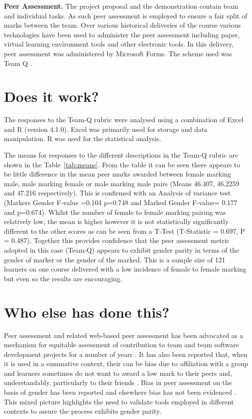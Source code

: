 \documentclass[sigconf, anonymous=true]{acmart}
\begin{document}
\textbf{Peer Assessment.}
The project proposal and the demonstration contain team and individual tasks. As such peer assessment is employed to ensure a fair split of marks between the team. Over various historical deliveries of the course various technologies have been used to administer the peer assessment including paper, virtual learning environment tools and other electronic tools. In this delivery, peer assessment was administered by Microsoft Forms. The scheme used was Team Q \cite{Britton2017}.
\section{Does it work?}	
The responses to the Team-Q rubric were analysed using a combination of Excel and R (version 4.1.0). Excel was primarily used for storage and data manipulation. R was used for the statistical analysis. 

The means for responses to the different descriptions in the Team-Q rubric are shown in the Table~\ref{tab:means}. From the table it can be seen there appears to be little difference in the mean peer marks awarded between female marking male, male marking female or male marking male pairs (Means 46.407, 46.2259 and 47.216 respectively). This is confirmed with an Analysis of variance test (Markers Gender F-value =0.104 p=0.748 and Marked Gender F-value= 0.177 and p=0.674). Whilst the number of female to female marking pairing was relatively low, the mean is higher however it is not statistically significantly different to the other scores as can be seen from a T-Test (T-Statistic = 0.697, P = 0.487). Together this provides confidence that the peer assessment metric adopted in this case (Team-Q) appears to exhibit gender parity in terms of the gender of marker or the gender of the marked. This is a sample size of 121 learners on one course delivered with a low incidence of female to female marking but even so the results are encouraging.


\section{Who else has done this?}
Peer assessment and related web-based peer assessment has been advocated as a mechanism for equitable assessment of contribution to team and team software development projects for a number of years \cite{Clark2005,Raban_Litchfield_2007, Gordon2010,Fagerholm, Britton2017,Philips21}. It has also been reported that, when it is used in a summative context, their can be bias due to affiliation with a group \cite{Cestone2008} and learners sometimes do not want to award a low mark to their peers and, understandably, particularly to their friends \cite{Sridharam2003}.  Bias in peer assessment on the basis of gender has been reported \cite{Heels2019,Stonewall2018} and elsewhere bias has not been evidenced \cite{Tucker2014,Falchikov1997}. This mixed picture highlights the need to validate tools employed in different contexts to assure the process exhibits gender parity.
\end{document}
